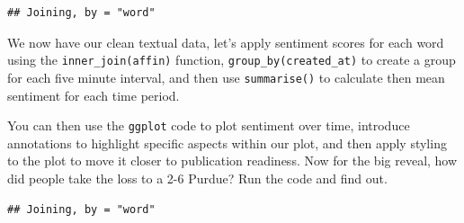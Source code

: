 \documentclass[]{book}
\newenvironment{Shaded}{\begin{snugshade}}{\end{snugshade}}
\newcommand{\DataTypeTok}[1]{\textcolor[rgb]{0.13,0.29,0.53}{#1}}
\newcommand{\KeywordTok}[1]{\textcolor[rgb]{0.13,0.29,0.53}{\textbf{#1}}}
\newcommand{\NormalTok}[1]{#1}
\newcommand{\OperatorTok}[1]{\textcolor[rgb]{0.81,0.36,0.00}{\textbf{#1}}}
\newcommand{\StringTok}[1]{\textcolor[rgb]{0.31,0.60,0.02}{#1}}
\begin{document}
\begin{verbatim}
## Joining, by = "word"
\end{verbatim}

We now have our clean textual data, let's apply sentiment scores for each word using the \texttt{inner\_join(affin)} function, \texttt{group\_by(created\_at)} to create a group for each five minute interval, and then use \texttt{summarise()} to calculate then mean sentiment for each time period.

You can then use the \texttt{ggplot} code to plot sentiment over time, introduce annotations to highlight specific aspects within our plot, and then apply styling to the plot to move it closer to publication readiness. Now for the big reveal, how did people take the loss to a 2-6 Purdue? Run the code and find out.

\begin{Shaded}
\end{Shaded}

\begin{verbatim}
## Joining, by = "word"
\end{verbatim}
\end{document}
